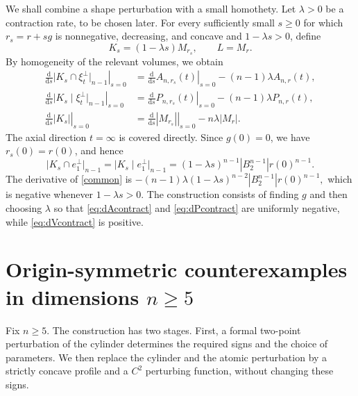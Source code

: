 \documentclass[11pt]{article}
\theoremstyle{remark}
\begin{document}
We shall combine a shape perturbation with a small homothety.  Let
$\lambda>0$ be a contraction rate, to be chosen later.  For every
sufficiently small $s\geq0$ for which $r_s=r+sg$ is nonnegative, decreasing,
and concave and $1-\lambda s>0$, define
\begin{equation}\label{eq:homothetic-perturbation}
 K_s=(1-\lambda s)M_{r_s},\qquad L=M_r.
\end{equation}
By homogeneity of the relevant volumes, we obtain
\begin{align}
 \left.\frac{\mathrm d}{\mathrm d s}
 \bigl|K_s\cap\xi_t^\perp\bigr|_{n-1}\right|_{s=0}
 &=\left.\frac{\mathrm d}{\mathrm d s}A_{n,r_s}(t)\right|_{s=0}
   -(n-1)\lambda A_{n,r}(t),
 \label{eq:dAcontract}\\
 \left.\frac{\mathrm d}{\mathrm d s}
 \bigl|K_s\mid\xi_t^\perp\bigr|_{n-1}\right|_{s=0}
 &=\left.\frac{\mathrm d}{\mathrm d s}P_{n,r_s}(t)\right|_{s=0}
   -(n-1)\lambda P_{n,r}(t),
 \label{eq:dPcontract}\\
\left.\frac{\mathrm d}{\mathrm d s}|K_s|\right|_{s=0}
&=\left.\frac{\mathrm d}{\mathrm d s}|M_{r_s}|\right|_{s=0}
   -n\lambda|M_r|.
 \label{eq:dVcontract}
\end{align}
The axial direction $t=\infty$ is covered directly.  Since $g(0)=0$, we
have $r_s(0)=r(0)$, and hence
\begin{equation}\label{common}
 \bigl|K_s\cap e_1^\perp\bigr|_{n-1}
 =\bigl|K_s\mid e_1^\perp\bigr|_{n-1}
 =(1-\lambda s)^{n-1}|B_2^{n-1}|r(0)^{n-1}.
\end{equation}
The derivative of \eqref{common} is
$
 -(n-1)\lambda(1-\lambda s)^{n-2}
 |B_2^{n-1}|r(0)^{n-1},
$
which is negative whenever $1-\lambda s>0$. 
The construction consists of finding $g$ and then choosing $\lambda$ so
that \eqref{eq:dAcontract} and \eqref{eq:dPcontract} are uniformly negative,
while \eqref{eq:dVcontract} is positive.


\section{Origin-symmetric counterexamples in dimensions
\texorpdfstring{$n\geq5$}{n >= 5}}
\label{sec:cylinder}
Fix $n\geq5$.  The construction has two stages.  First, a formal two-point
perturbation of the cylinder determines the required signs and the choice
of parameters.  We then replace the cylinder and the atomic perturbation
by a strictly concave profile and a $C^2$ perturbing function, without
changing these signs.
\end{document}
